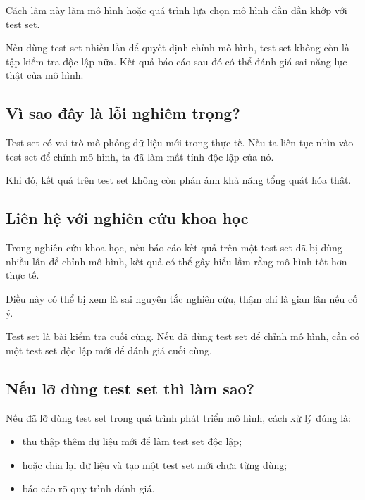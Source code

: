 Cách làm này làm mô hình hoặc quá trình lựa chọn mô hình dần dần khớp với test set.

\begin{canhbao}
Nếu dùng test set nhiều lần để quyết định chỉnh mô hình, test set không còn là tập kiểm tra độc lập nữa. Kết quả báo cáo sau đó có thể đánh giá sai năng lực thật của mô hình.
\end{canhbao}

\subsection{Vì sao đây là lỗi nghiêm trọng?}

Test set có vai trò mô phỏng dữ liệu mới trong thực tế. Nếu ta liên tục nhìn vào test set để chỉnh mô hình, ta đã làm mất tính độc lập của nó.

Khi đó, kết quả trên test set không còn phản ánh khả năng tổng quát hóa thật.

\subsection{Liên hệ với nghiên cứu khoa học}

Trong nghiên cứu khoa học, nếu báo cáo kết quả trên một test set đã bị dùng nhiều lần để chỉnh mô hình, kết quả có thể gây hiểu lầm rằng mô hình tốt hơn thực tế.

Điều này có thể bị xem là sai nguyên tắc nghiên cứu, thậm chí là gian lận nếu cố ý.

\begin{ghinho}
Test set là bài kiểm tra cuối cùng. Nếu đã dùng test set để chỉnh mô hình, cần có một test set độc lập mới để đánh giá cuối cùng.
\end{ghinho}

\subsection{Nếu lỡ dùng test set thì làm sao?}

Nếu đã lỡ dùng test set trong quá trình phát triển mô hình, cách xử lý đúng là:

\begin{itemize}
    \item thu thập thêm dữ liệu mới để làm test set độc lập;
    \item hoặc chia lại dữ liệu và tạo một test set mới chưa từng dùng;
    \item báo cáo rõ quy trình đánh giá.
\end{itemize}

